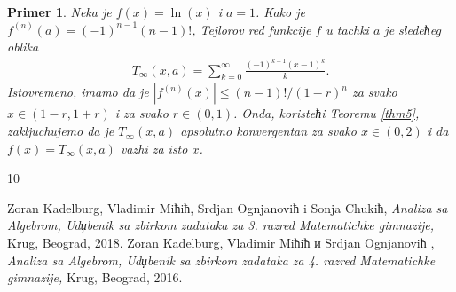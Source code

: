 \documentclass[12pt,a4paper]{article}
\newtheorem{pri}{Primer}[section]
\newcommand{\cyr}{\fontencoding{OT2}\selectfont\selectlanguage{serbian}}
\begin{document}
\begin{pri}
Neka je $f(x)=\ln(x)$ i $a=1$. 
Kako je $f^{(n)}(a)=(-1)^{n-1}(n-1)!$, 
Tejlorov red
funkcije $f$ u tachki $a$ je sledeћeg oblika
\begin{align*}
    T_{\infty}(x,a)
    =
    \sum_{k=0}^{\infty}\frac{(-1)^{k-1}(x-1)^{k}}{k}. 
\end{align*}
Istovremeno, imamo da je $|f^{(n)}(x)|\leq (n-1)!/(1-r)^{n}$ 
za svako $x\in(1-r,1+r)$ i za svako $r\in(0,1)$. 
Onda, koristeћi Teoremu \ref{thm5}, 
zakljuchujemo da je $T_{\infty}(x,a)$ apsolutno konvergentan
za svako $x\in(0,2)$
i da $f(x)=T_{\infty}(x,a)$ vazhi za isto $x$. 
\end{pri}

\begin{thebibliography}{10}

Zoran Kadelburg, Vladimir Miћiћ, Srdjan Ognjanoviћ 
i Sonja Chukiћ,  
{\em Analiza sa Algebrom, Udџbenik sa zbirkom zadataka za 3. razred Matematichke gimnazije,}
Krug, Beograd, 2018. 
\cyr
{}
Zoran Kadelburg, Vladimir Miћiћ и Srdjan Ognjanoviћ ,  
{\em Analiza sa Algebrom, Udџbenik sa zbirkom zadataka za 4. razred Matematichke gimnazije,}
Krug, Beograd, 2016. 
\end{thebibliography}
\end{document}
